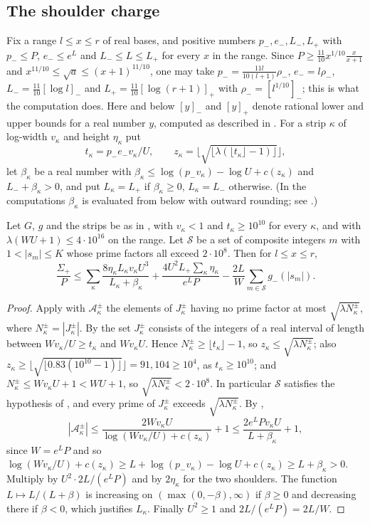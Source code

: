 \documentclass[11pt,colorlinks]{charlie}
\newcommand{\cA}{\mathcal A}
\newcommand{\cS}{\mathcal S}
\begin{document}
\subsection{The shoulder charge}
Fix a range $l\le x\le r$ of real bases, and positive numbers $p_-,e_-,L_-,L_+$ with $p_-\le P$, $e_-\le e^L$ and $L_-\le L\le L_+$ for every $x$ in the range. Since $P\ge\frac{11}{10}x^{1/10}\frac x{x+1}$ and $x^{11/10}\le\sqrt a\le(x+1)^{11/10}$, one may take $p_-=\frac{11l}{10(l+1)}\rho_-$, $e_-=l\rho_-$, $L_-=\frac{11}{10}[\log l]_-$ and $L_+=\frac{11}{10}[\log(r+1)]_+$ with $\rho_-=[l^{1/10}]_-$; this is what the computation does. Here and below $[y]_-$ and $[y]_+$ denote rational lower and upper bounds for a real number $y$, computed as described in . For a strip $\kappa$ of log-width $v_\kappa$ and height $\eta_\kappa$ put
\[
 t_\kappa=p_-e_-v_\kappa/U,\qquad z_\kappa=\big\lfloor\sqrt{\lfloor\lambda(\lfloor t_\kappa\rfloor-1)\rfloor}\big\rfloor,
\]
let $\beta_\kappa$ be a real number with $\beta_\kappa\le\log(p_-v_\kappa)-\log U+c(z_\kappa)$ and $L_-+\beta_\kappa>0$, and put $L_\kappa=L_+$ if $\beta_\kappa\ge0$, $L_\kappa=L_-$ otherwise. (In the computations $\beta_\kappa$ is evaluated from below with outward rounding; see .)

\begin{proposition}\label{prop:charge}
Let $G$, $g$ and the strips be as in , with $v_\kappa<1$ and $t_\kappa\ge10^{10}$ for every $\kappa$, and with $\lambda(WU+1)\le4\cdot10^{16}$ on the range. Let $\cS$ be a set of composite integers $m$ with $1<|s_m|\le K$ whose prime factors all exceed $2\cdot10^8$. Then for $l\le x\le r$,
\[
 \frac{\Sigma_+}P\le\sum_\kappa\frac{8\eta_\kappa L_\kappa v_\kappa U^3}{L_\kappa+\beta_\kappa}+\frac{4U^2L_+\sum_\kappa\eta_\kappa}{e^{L}P}-\frac{2L}{W}\sum_{m\in\cS}g_-(|s_m|).
\]
\end{proposition}
\begin{proof}
Apply  with $\cA_\kappa^\pm$ the elements of $J_\kappa^\pm$ having no prime factor at most $\sqrt{\lambda N_\kappa^\pm}$, where $N_\kappa^\pm=|J_\kappa^\pm|$. By  the set $J_\kappa^\pm$ consists of the integers of a real interval of length between $Wv_\kappa/U\ge t_\kappa$ and $Wv_\kappa U$. Hence $N_\kappa^\pm\ge\lfloor t_\kappa\rfloor-1$, so $z_\kappa\le\sqrt{\lambda N_\kappa^\pm}$; also $z_\kappa\ge\lfloor\sqrt{\lfloor0.83(10^{10}-1)\rfloor}\rfloor=91{,}104\ge10^4$, as $t_\kappa\ge10^{10}$; and $N_\kappa^\pm\le Wv_\kappa U+1<WU+1$, so $\sqrt{\lambda N_\kappa^\pm}<2\cdot10^8$. In particular $\cS$ satisfies the hypothesis of , and every prime of $J_\kappa^\pm$ exceeds $\sqrt{\lambda N_\kappa^\pm}$. By ,
\[
 |\cA_\kappa^\pm|\le\frac{2Wv_\kappa U}{\log(Wv_\kappa/U)+c(z_\kappa)}+1\le\frac{2e^LPv_\kappa U}{L+\beta_\kappa}+1,
\]
since $W=e^LP$ and so $\log(Wv_\kappa/U)+c(z_\kappa)\ge L+\log(p_-v_\kappa)-\log U+c(z_\kappa)\ge L+\beta_\kappa>0$. Multiply by $U^2\cdot2L/(e^LP)$ and by $2\eta_\kappa$ for the two shoulders. The function $L\mapsto L/(L+\beta)$ is increasing on $(\max(0,-\beta),\infty)$ if $\beta\ge0$ and decreasing there if $\beta<0$, which justifies $L_\kappa$. Finally $U^2\ge1$ and $2L/(e^LP)=2L/W$.
\end{proof}
\end{document}
